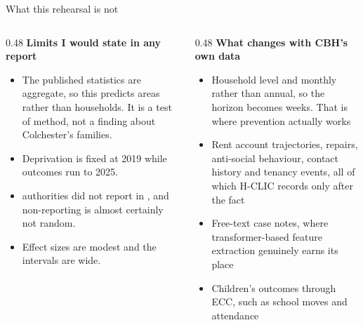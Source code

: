\documentclass[aspectratio=169,11pt]{beamer}
\newcommand{\lead}[1]{{\color{seriesone}\bfseries #1}}
\begin{document}
\begin{frame}{What this rehearsal is not}
  \begin{columns}[T,onlytextwidth]
    \begin{column}{0.48\textwidth}
      \lead{Limits I would state in any report}
      \begin{itemize}\footnotesize
        \item The published statistics are aggregate, so this predicts areas
              rather than households. It is a test of method, not a finding
              about Colchester's families.
        \item Deprivation is fixed at 2019 while outcomes run to 2025.
        \item \MissingReturnsLast{} authorities did not report in \LastYear,
              and non-reporting is almost certainly not random.
        \item Effect sizes are modest and the intervals are wide.
      \end{itemize}
    \end{column}
    \begin{column}{0.48\textwidth}
      \lead{What changes with CBH's own data}
      \begin{itemize}\footnotesize
        \item Household level and monthly rather than annual, so the horizon
              becomes weeks. That is where prevention actually works
        \item Rent account trajectories, repairs, anti-social behaviour,
              contact history and tenancy events, all of which H-CLIC records
              only after the fact
        \item Free-text case notes, where transformer-based feature
              extraction genuinely earns its place
        \item Children's outcomes through ECC, such as school moves and
              attendance
      \end{itemize}
    \end{column}
  \end{columns}
\end{frame}
\end{document}
